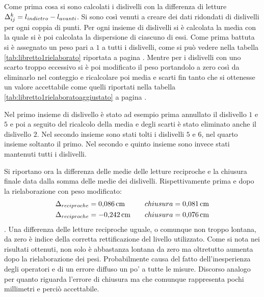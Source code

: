 Come prima cosa si sono calcolati i dislivelli con la differenza di letture $\Delta_{ij}^{k}=\break l_{indietro}-l_{avanti}$. %
Si sono così venuti a creare dei dati ridondati di dislivelli per ogni coppia di punti.
Per ogni insieme di dislivelli si è calcolata la media con la quale si è poi calcolata la dispersione di ciascuno di essi.
Come prima battuta si è assegnato un peso pari a $1$ a tutti i dislivelli, come si può vedere nella tabella \ref{tab:libretto1rielaborato} riportata a pagina \pageref{tab:libretto1rielaborato}.
Mentre per i dislivelli con uno scarto troppo eccessivo si è poi modificato il peso portandolo a zero così da eliminarlo nel conteggio e ricalcolare poi media e scarti fin tanto che si ottenesse un valore accettabile come quelli riportati nella tabella \ref{tab:libretto1rielaboratoaggiustato} a pagina \pageref{tab:libretto1rielaboratoaggiustato}.

Nel primo insieme di dislivello è stato ad esempio prima annullato il dislivello $1$ e $5$ e poi a seguito del ricalcolo della media e degli scarti è stato eliminato anche il dislivello $2$.
Nel secondo insieme sono stati tolti i dislivelli $5$ e $6$, nel quarto insieme soltanto il primo. 
Nel secondo e quinto insieme sono invece stati mantenuti tutti i dislivelli.

Si riportano ora la differenza delle medie delle letture reciproche e la chiusura finale data dalla somma delle medie dei dislivelli. Rispettivamente prima e dopo la rielaborazione con peso modificato:
\begin{align*}
\Delta_{reciproche} &= \SI{0.086}{\centi\metre} \quad & chiusura = \SI{0.081}{\centi\metre} \\
\Delta_{reciproche} &= \SI{-0.242}{\centi\metre} \quad & chiusura = \SI{0.076}{\centi\metre}
\end{align*}.
Una differenza delle letture reciproche uguale, o comunque non troppo lontana, da zero è indice della corretta rettificazione del livello utilizzato. 
Come si nota nei risultati ottenuti, non solo è abbastanza lontana da zero ma oltretutto aumenta dopo la rielaborazione dei pesi. 
Probabilmente causa del fatto dell'inesperienza degli operatori e di un errore diffuso un po' a tutte le misure.
Discorso analogo per quanto riguarda l'errore di chiusura ma che comunque rappresenta pochi millimetri e perciò accettabile.
%
\clearpage %
